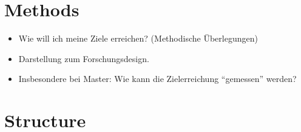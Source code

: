 
\section{Methods}
\begin{itemize}
	\item Wie will ich meine Ziele erreichen? (Methodische Überlegungen)
	\item Darstellung zum Forschungsdesign.
	\item Insbesondere bei Master: Wie kann die Zielerreichung ``gemessen'' werden?
\end{itemize}


\section{Structure}

